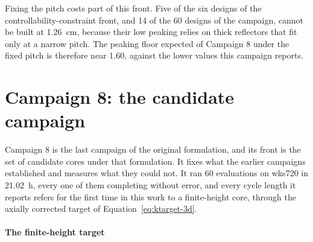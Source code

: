 Fixing the pitch costs part of this front. Five of the six designs of
the controllability-constraint front, and 14 of the 60 designs of the campaign,
cannot be built at \SI{1.26}{cm}, because their low peaking relies on
thick reflectors that fit only at a narrow pitch. The peaking floor
expected of Campaign 8 under the fixed pitch is therefore near 1.60,
against the lower values this campaign reports.

\label{sec:res-c6}\label{sec:res-c6-blocks}\label{tab:c6-blocks}\label{sec:res-c6-doe}\label{sec:res-c6-defects}\label{tab:c6-b2-collapse}\label{tab:c6-b3-fail}\label{sec:res-c6-margin}\label{fig:c6-convergence}\label{sec:res-c6-front}\label{fig:c6-front}\label{tab:c6-front}\label{fig:c6-parallel}\label{sec:res-c6-influence}\label{fig:c6-influence}\label{tab:c6-spearman}\label{fig:c6-constraints}\label{sec:res-c6-bscreen}\label{tab:c6-front-screened}\label{sec:res-c6-compare}
\label{sec:res-c7}\label{sec:res-c7-basis}\label{eq:g-ctrl}\label{sec:res-c7-blocks}\label{tab:c7-blocks}\label{fig:c7-diversity}\label{sec:res-c7-screens}\label{tab:c7-nesting}\label{fig:c7-screens}\label{tab:c7-front}\label{fig:c7-pareto}\label{sec:res-c7-worth}\label{fig:c7-worth}\label{fig:c7-influence}\label{sec:res-c7-rodded}\label{fig:c7-rodded}\label{sec:res-c7-uncertainty}\label{fig:c7-histories}\label{eq:sigma-beoc}\label{eq:sigma-efpd}\label{fig:c7-uncertainty}\label{tab:c7-uncertainty}\label{sec:res-c7-hump}\label{fig:c7-khist-gd}\label{tab:c7-hump}\label{sec:res-c7-cost}\label{sec:res-c7-limits}
\section{Campaign 8: the candidate campaign}
\label{sec:res-c8}

Campaign 8 is the last campaign of the original formulation, and its
front is the set of candidate cores under that formulation. It fixes what the earlier campaigns established and
measures what they could not. It ran 60 evaluations on wks720 in
\SI{21.02}{h}, every one of them completing without error, and every
cycle length it reports refers for the first time in this work to a
finite-height core, through the axially corrected target of
Equation~\eqref{eq:ktarget-3d}.

\paragraph{The finite-height target}
\label{sec:res-c8-target}


